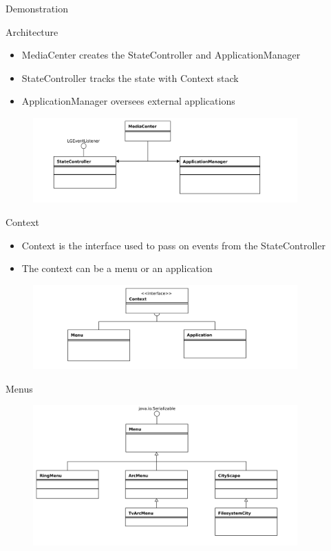 \documentclass[style=smrt,mode=present,paper=screen]{powerdot}
\begin{document}
\begin{slide}{Demonstration}
\end{slide}


\begin{slide}{Architecture}
\begin{itemize}
\item MediaCenter creates the StateController and ApplicationManager
\item StateController tracks the state with Context stack
\item ApplicationManager oversees external applications
\end{itemize}
\begin{figure}
	\includegraphics[angle=-90,width=4in]{figures/MediaCenter-uml}
\end{figure}
\end{slide}

\begin{slide}{Context}
\begin{itemize}
\item Context is the interface used to pass on events from the StateController
\item The context can be a menu or an application
\end{itemize}
\begin{figure}[htb]
	\includegraphics[angle=-90,width=4in]{figures/Context-uml}
\end{figure}
\end{slide}

\begin{slide}{Menus}
\begin{figure}[htb]
	\includegraphics[angle=-90,width=4in]{figures/Menu-uml}
\end{figure}
\end{slide}
\end{document}
